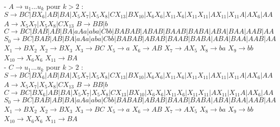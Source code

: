 \documentclass{article}
\begin{document}
- $A \rightarrow u_1...u_k$ pour $k>2$ :
\newline $S \rightarrow BC|BX_6|AB|BA|X_5X_7|X_5X_8|CX_{13}|BX_{10}|X_6X_6|X_{11}X_6|X_{11}X_{11}|AX_{11}|X_{11}A|AX_6|AA$
\newline $A \rightarrow X_5X_7|X_5X_8|CX_{13}$
\newline $B \rightarrow BB|b$
\newline $C \rightarrow BC|BAB|AB|BA|aAa|aba|Cbb|BABAB|ABAB|BAAB|BABA|ABA|BAA|AAB|AA$
\newline $S_0 \rightarrow BC|BAB|AB|BA|aAa|aba|Cbb|BABAB|ABAB|BAAB|BABA|ABA|BAA|AAB|AA$
\newline $X_1 \rightarrow BX_2$
\newline $X_2 \rightarrow BX_3$
\newline $X_3 \rightarrow BC$
\newline $X_5 \rightarrow a$
\newline $X_6 \rightarrow AB$
\newline $X_7 \rightarrow AX_5$
\newline $X_8 \rightarrow ba$
\newline $X_9 \rightarrow bb$
\newline $X_{10} \rightarrow X_6X_6$
\newline $X_{11} \rightarrow BA$
\\

- $C \rightarrow u_1...u_k$ pour $k>2$ :
\newline $S \rightarrow BC|BX_6|AB|BA|X_5X_7|X_5X_8|CX_{13}|BX_{10}|X_6X_6|X_{11}X_6|X_{11}X_{11}|AX_{11}|X_{11}A|AX_6|AA$
\newline $A \rightarrow X_5X_7|X_5X_8|CX_{13}$
\newline $B \rightarrow BB|b$
\newline $C \rightarrow BC|BX_6|AB|BA|X_5X_7|X_5X_8|CX_{13}|BX_{10}|X_6X_6|X_{11}X_6|X_{11}X_{11}|AX_{11}|X_{11}A|AX_6|AA$
\newline $S_0 \rightarrow BC|BAB|AB|BA|aAa|aba|Cbb|BABAB|ABAB|BAAB|BABA|ABA|BAA|AAB|AA$
\newline $X_1 \rightarrow BX_2$
\newline $X_2 \rightarrow BX_3$
\newline $X_3 \rightarrow BC$
\newline $X_5 \rightarrow a$
\newline $X_6 \rightarrow AB$
\newline $X_7 \rightarrow AX_5$
\newline $X_8 \rightarrow ba$
\newline $X_9 \rightarrow bb$
\newline $X_{10} \rightarrow X_6X_6$
\newline $X_{11} \rightarrow BA$
\\
\end{document}
